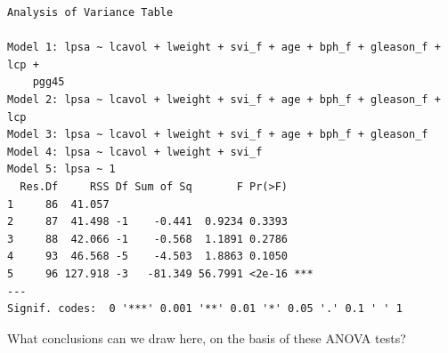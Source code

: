 \documentclass[]{book}
\theoremstyle{definition}
\theoremstyle{definition}
\theoremstyle{definition}
\theoremstyle{remark}
\begin{document}
\begin{verbatim}
Analysis of Variance Table

Model 1: lpsa ~ lcavol + lweight + svi_f + age + bph_f + gleason_f + lcp + 
    pgg45
Model 2: lpsa ~ lcavol + lweight + svi_f + age + bph_f + gleason_f + lcp
Model 3: lpsa ~ lcavol + lweight + svi_f + age + bph_f + gleason_f
Model 4: lpsa ~ lcavol + lweight + svi_f
Model 5: lpsa ~ 1
  Res.Df     RSS Df Sum of Sq       F Pr(>F)    
1     86  41.057                                
2     87  41.498 -1    -0.441  0.9234 0.3393    
3     88  42.066 -1    -0.568  1.1891 0.2786    
4     93  46.568 -5    -4.503  1.8863 0.1050    
5     96 127.918 -3   -81.349 56.7991 <2e-16 ***
---
Signif. codes:  0 '***' 0.001 '**' 0.01 '*' 0.05 '.' 0.1 ' ' 1
\end{verbatim}

What conclusions can we draw here, on the basis of these ANOVA tests?


\end{document}
